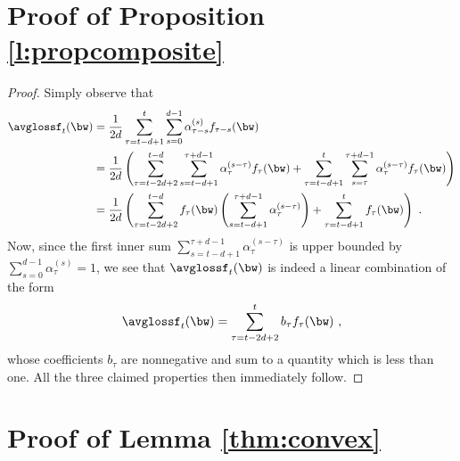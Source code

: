 \section{Proof of Proposition \ref{l:propcomposite}}

\begin{proof}
Simply observe that 
%
\begin{align*}
\avglossf_t(\bw) 
&= \frac{1}{2d}\sum_{\tau=t-d+1}^t \sum_{s=0}^{d-1} \alpha_{\tau-s}^{(s)}f_{\tau-s}(\bw)\\
&= \frac{1}{2d}
    \left(
    \sum_{\tau=t-2d+2}^{t-d} \sum_{s=t-d+1}^{\tau+d-1} \alpha_{\tau}^{(s-\tau)}f_{\tau}(\bw)
    + 
    \sum_{\tau=t-d+1}^{t} \sum_{s=\tau}^{\tau+d-1} \alpha_{\tau}^{(s-\tau)}f_{\tau}(\bw)
    \right)\\
&= \frac{1}{2d}
    \left(
    \sum_{\tau=t-2d+2}^{t-d} f_{\tau}(\bw) \left(\sum_{s=t-d+1}^{\tau+d-1} \alpha_{\tau}^{(s-\tau)}\right)
    + 
    \sum_{\tau=t-d+1}^{t} f_{\tau}(\bw)
    \right)~. 
\end{align*}
%
Now, since the first inner sum $\sum_{s=t-d+1}^{\tau+d-1} \alpha_{\tau}^{(s-\tau)}$ is upper bounded by $\sum_{s=0}^{d-1} \alpha_{\tau}^{(s)} = 1$, we
see that $\avglossf_t(\bw)$ is indeed a linear combination of the form
%
\[
\avglossf_t(\bw) = \sum_{\tau=t-2d+2}^{t} b_{\tau} f_{\tau}(\bw)~,
\]
%
whose coefficients $b_{\tau}$ are nonnegative and sum to a quantity which is less than one. All the three claimed properties then immediately follow.
%
\end{proof}




\section{Proof of Lemma \ref{thm:convex}}

